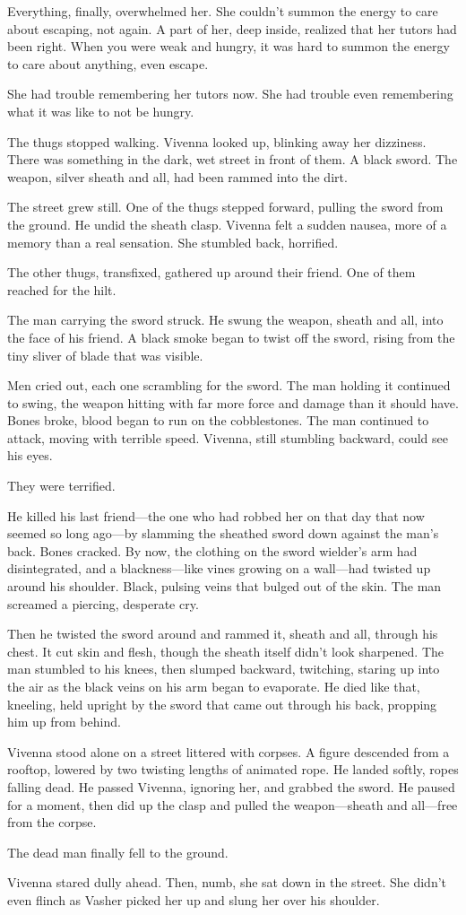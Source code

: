 Everything, finally, overwhelmed her. She couldn’t summon the energy to care about escaping, not again. A part of her, deep inside, realized that her tutors had been right. When you were weak and hungry, it was hard to summon the energy to care about anything, even escape.

She had trouble remembering her tutors now. She had trouble even remembering what it was like to not be hungry.

The thugs stopped walking. Vivenna looked up, blinking away her dizziness. There was something in the dark, wet street in front of them. A black sword. The weapon, silver sheath and all, had been rammed into the dirt.

The street grew still. One of the thugs stepped forward, pulling the sword from the ground. He undid the sheath clasp. Vivenna felt a sudden nausea, more of a memory than a real sensation. She stumbled back, horrified.

The other thugs, transfixed, gathered up around their friend. One of them reached for the hilt.

The man carrying the sword struck. He swung the weapon, sheath and all, into the face of his friend. A black smoke began to twist off the sword, rising from the tiny sliver of blade that was visible.

Men cried out, each one scrambling for the sword. The man holding it continued to swing, the weapon hitting with far more force and damage than it should have. Bones broke, blood began to run on the cobblestones. The man continued to attack, moving with terrible speed. Vivenna, still stumbling backward, could see his eyes.

They were terrified.

He killed his last friend—the one who had robbed her on that day that now seemed so long ago—by slamming the sheathed sword down against the man’s back. Bones cracked. By now, the clothing on the sword wielder’s arm had disintegrated, and a blackness—like vines growing on a wall—had twisted up around his shoulder. Black, pulsing veins that bulged out of the skin. The man screamed a piercing, desperate cry.

Then he twisted the sword around and rammed it, sheath and all, through his chest. It cut skin and flesh, though the sheath itself didn’t look sharpened. The man stumbled to his knees, then slumped backward, twitching, staring up into the air as the black veins on his arm began to evaporate. He died like that, kneeling, held upright by the sword that came out through his back, propping him up from behind.

Vivenna stood alone on a street littered with corpses. A figure descended from a rooftop, lowered by two twisting lengths of animated rope. He landed softly, ropes falling dead. He passed Vivenna, ignoring her, and grabbed the sword. He paused for a moment, then did up the clasp and pulled the weapon—sheath and all—free from the corpse.

The dead man finally fell to the ground.

Vivenna stared dully ahead. Then, numb, she sat down in the street. She didn’t even flinch as Vasher picked her up and slung her over his shoulder.

